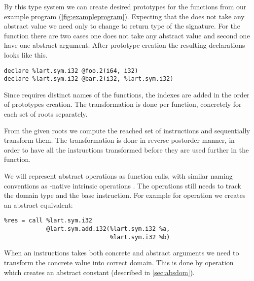 By this type system we can create desired prototypes for the functions from our
example program (\autoref{fig:exampleprogram}). Expecting that the 
does not take any abstract value we need only to change to return type of the
signature. For the  function there are two cases one does not take any
abstract value and second one have one abstract argument. After prototype
creation the resulting \LLVM declarations looks like this.
\begin{verbatim}
declare %lart.sym.i32 @foo.2(i64, i32)
declare %lart.sym.i32 @bar.2(i32, %lart.sym.i32)
\end{verbatim}
Since \LLVM requires distinct names of the functions, the indexes are added in
the order of prototypes creation. The transformation is done per function,
concretely for each set of roots separately.

From the given roots we compute the reached set of instructions and sequentially
transform them. The transformation is done in reverse postorder manner, in order
to have all the instructions transformed before they are used further in the
function.

We will represent abstract operations as function calls, with similar naming
conventions as \LLVM-native intrinsic operations \cite{LLVM:langref}. The
operations still needs to track the domain type and the base \LLVM instruction.
For example for  operation we creates an abstract equivalent:
\begin{verbatim}
%res = call %lart.sym.i32
            @lart.sym.add.i32(%lart.sym.i32 %a,
                              %lart.sym.i32 %b)
\end{verbatim}

When an instructions takes both concrete and abstract arguments we need to
transform the concrete value into correct domain. This is done by 
operation which creates an abstract constant (described in
\autoref{sec:absdom}).


